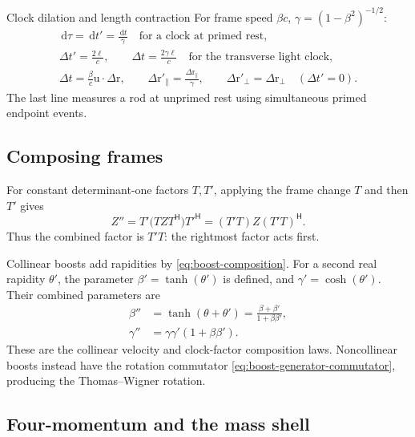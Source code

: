 \documentclass[11pt]{article}
\newcommand{\pv}[1]{{#1}}
\newcommand{\vstyle}[1]{{\bm{\mathrm{#1}}}}
\newcommand{\pT}{\pv{T}}
\newcommand{\pZ}{\pv{Z}}
\numberwithin{equation}{section}
\newcommand{\dotprod}{\cdot}
\newcommand{\br}{\vstyle{r}}
\newcommand{\bu}{\vstyle{u}}
\newcommand{\dd}{\,\mathrm d}
\begin{document}
\begin{SIunits}{Clock dilation and length contraction}
For frame speed $\beta c$, $\gamma=(1-\beta^2)^{-1/2}$:
\begin{gather*}
 \dd\tau=\dd t'=\frac{\dd t}{\gamma}
 \quad\text{for a clock at primed rest},\\
 \Delta t'=\frac{2\ell}{c},\qquad
 \Delta t=\frac{2\gamma\ell}{c}
 \quad\text{for the transverse light clock},\\
 \Delta t=\frac{\beta}{c}\bu\dotprod\Delta\br,
 \qquad \Delta\br'_{\parallel}=\frac{\Delta\br_{\parallel}}{\gamma},
 \qquad \Delta\br'_{\perp}=\Delta\br_{\perp}
 \quad(\Delta t'=0).
\end{gather*}
The last line measures a rod at unprimed rest using simultaneous primed
endpoint events.
\end{SIunits}
\FloatBarrier

\subsection{Composing frames}
For constant determinant-one factors $\pT,\pT'$, applying the frame change
$\pT$ and then $\pT'$ gives
\begin{equation*}
 \pZ''=\pT'\bigl(\pT \pZ \pT^{\mathsf H}\bigr)\pT'^{\mathsf H}
 =(\pT'\pT)\pZ(\pT'\pT)^{\mathsf H}.
\end{equation*}
Thus the combined factor is $\pT'\pT$: the rightmost factor acts first.

Collinear boosts add rapidities by \eqref{eq:boost-composition}.
For a second real rapidity $\theta'$, the parameter $\beta'=\tanh(\theta')$ is defined, and
$\gamma'=\cosh(\theta')$.  Their combined parameters are
\begin{align*}
 \beta''&=\tanh(\theta+\theta')
 =\frac{\beta+\beta'}{1+\beta\beta'}, \\
 \gamma''&=\gamma\gamma'(1+\beta\beta').
\end{align*}
These are the collinear velocity and clock-factor composition laws.
Noncollinear boosts instead have the rotation commutator
\eqref{eq:boost-generator-commutator}, producing the Thomas--Wigner rotation.

\subsection{Four-momentum and the mass shell}
\label{sec:four-momentum}
\end{document}
